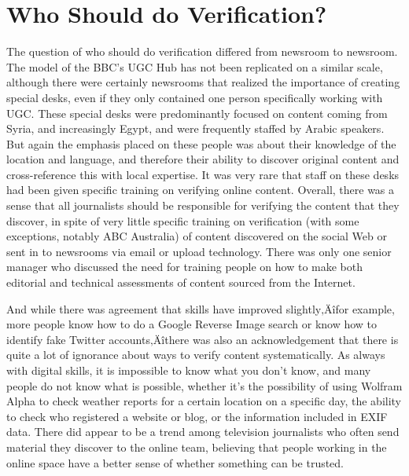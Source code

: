 \documentclass[symmetric, notoc, nobib]{towcenter-book}
\begin{document}
\section{Who Should do Verification?}
The question of who should do verification differed from newsroom to
newsroom. The model of the BBC's UGC Hub has not been replicated
on a similar scale, although there were certainly newsrooms that realized
the importance of creating special desks, even if they only contained one
person specifically working with UGC. These special desks were predominantly
focused on content coming from Syria, and increasingly Egypt, and
were frequently staffed by Arabic speakers. But again the emphasis placed
on these people was about their knowledge of the location and language,
and therefore their ability to discover original content and cross-reference
this with local expertise. It was very rare that staff on these desks had been
given specific training on verifying online content.
Overall, there was a sense that all journalists should be responsible for verifying
the content that they discover, in spite of very little specific training
on verification (with some exceptions, notably ABC Australia) of content
discovered on the social Web or sent in to newsrooms via email or upload
technology. There was only one senior manager who discussed the need for
training people on how to make both editorial and technical assessments of
content sourced from the Internet.

And while there was agreement that skills have improved slightly‚Äîfor
example, more people know how to do a Google Reverse Image search or
know how to identify fake Twitter accounts‚Äîthere was also an acknowledgement
that there is quite a lot of ignorance about ways to verify content
systematically. As always with digital skills, it is impossible to know what
you don't know, and many people do not know what is possible, whether it's
the possibility of using Wolfram Alpha to check weather reports for a certain
location on a specific day, the ability to check who registered a website
or blog, or the information included in EXIF data. There did appear to be
a trend among television journalists who often send material they discover
to the online team, believing that people working in the online space have a
better sense of whether something can be trusted.
\end{document}
